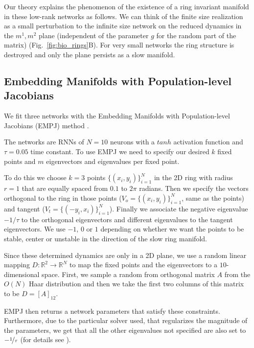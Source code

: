 \documentclass{article} %
\newcounter{ct}
\newcommand{\reals}{\mathbb{R}}
\theoremstyle{definition}
\theoremstyle{remark}
\begin{document}
Our theory explains the phenomenon of the existence of a ring invariant manifold in these low-rank networks as follows. %
We can think of the finite size realization as a small perturbation to the infinite size network on the reduced dynamics in the \(m^{1}, m^{2}\) plane (independent of the parameter \(g\) for the random part of the matrix)  (Fig.~\ref{fig:bio_rings}B).
 For very small networks the ring structure is destroyed and only the plane persists as a slow manifold.




\subsection{Embedding Manifolds with Population-level Jacobians}\label{sec:supp:empj}
We fit three networks with the Embedding Manifolds with Population-level Jacobians (EMPJ) method \citep{pollock2020}.

The networks are RNNs of \(N = 10\) neurons with a \(tanh\) activation function and \(\tau = 0.05\) time constant.
 To use EMPJ we need to specify our desired \(k\) fixed points and \(m\) eigenvectors and eigenvalues per fixed point.

To do this we choose \(k = 3\) points \(\{(x_{i}, y_{i})\}_{i = 1}^{N}\) in the 2D ring with radius \(r = 1\) that are equally spaced from \(0.1\) to \(2 \pi\) radians. Then we specify the vectors orthogonal to the ring in those points (\(V_{o} = \{(x_{i}, y_{i})\}_{i = 1}^{N}\), same as the points) and tangent (\(V_{t} = \{(-y_{i}, x_{i})\}_{i = 1}^{N}\)).
Finally we associate the negative eigenvalue \(-1/\tau\) to the orthogonal eigenvectors and different eigenvalues to the tangent eigenvectors. We use \(-1\), \(0\) or \(1\) depending on whether we want the points to be stable, center or unstable in the direction of the slow ring manifold.

Since these determined dynamics are only in a 2D plane, we use a random linear mapping \(D\colon\reals^{2}\rightarrow\reals^{N}\) to map the fixed points and the eigenvectors to a \(10\)-dimensional space. First, we sample a random from orthogonal matrix \(A\) from the \(O(N)\) Haar distribution and then we take the first two columns of this matrix to be \(D=[A]_{12}\).

EMPJ then returns a network parameters that satisfy these constraints. Furthermore, due to the particular solver used, that regularizes the magnitude of the parameters, we get that all the other eigenvalues not specified are also set to \(-\nicefrac{1}{\tau}\) (for details see \citep{pollock2020}).
\end{document}
